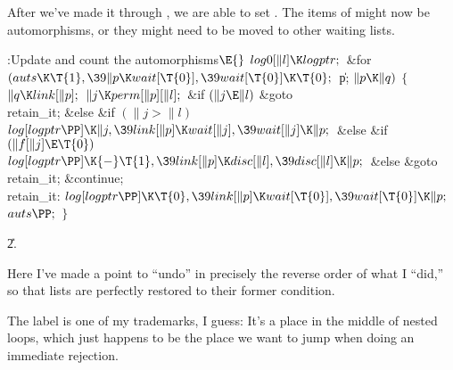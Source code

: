 After we've made it through , we are
able to set
. The items of  might now be
automorphisms,
or they might need to be moved to other waiting lists.

\Y\B\4:Update  and count the automorphisms\X${}\E{}$\6
$\\{log0}[\|l]\K\\{logptr};{}$\6
\&{for} ${}(\\{auts}\K\T{1},\39\|p\K\\{wait}[\T{0}],\39\\{wait}[\T{0}]\K%
\T{0};{}$ \|p; ${}\|p\K\|q){}$\5
${}\{{}$\1\6
${}\|q\K\\{link}[\|p];{}$\6
${}\|j\K\\{perm}[\|p][\|l];{}$\6
\&{if} ${}(\|j\E\|l){}$\1\5
\&{goto} \\{retain\_it};\2\6
\&{else} \&{if} ${}(\|j>\|l){}$\1\5
${}\\{log}[\\{logptr}\PP]\K\|j,\39\\{link}[\|p]\K\\{wait}[\|j],\39\\{wait}[\|j]%
\K\|p;{}$\2\6
\&{else} \&{if} ${}(\|f[\|j]\E\T{0}){}$\1\5
${}\\{log}[\\{logptr}\PP]\K{-}\T{1},\39\\{link}[\|p]\K\\{disc}[\|l],\39%
\\{disc}[\|l]\K\|p;{}$\2\6
\&{else}\1\5
\&{goto} \\{retain\_it};\2\6
\&{continue};\6
\4\\{retain\_it}:\5
${}\\{log}[\\{logptr}\PP]\K\T{0},\39\\{link}[\|p]\K\\{wait}[\T{0}],\39\\{wait}[%
\T{0}]\K\|p;{}$\6
${}\\{auts}\PP;{}$\6
\4${}\}{}$\2\par
\U2.\fi

Here I've made a point to ``undo'' in precisely the
reverse order
of what I ``did,'' so that lists are perfectly restored to their
former condition.

The label  is one of my trademarks, I guess: It's a place
in the middle of nested loops, which just happens to be the
place we want to jump when doing an immediate rejection.

